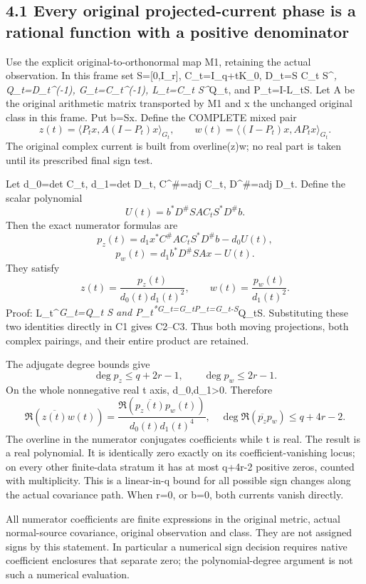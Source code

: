 \subsection{4.1 Every original projected-current phase is a rational function with a positive denominator}\label{every-original-projected-current-phase-is-a-rational-function-with-a-positive-denominator}

Use the explicit original-to-orthonormal map M1, retaining the actual observation. In this frame set S={[}0,I\_r{]}, C\_t=I\_q+tK\_0, D\_t=S C\_t S\^{}\emph{, Q\_t=D\_t\^{}(-1), G\_t=C\_t\^{}(-1), L\_t=C\_t S\^{}}Q\_t, and P\_t=I-L\_tS. Let A be the original arithmetic matrix transported by M1 and x the unchanged original class in this frame. Put b=Sx. Define the COMPLETE mixed pair \[
 z(t)=\langle P_tx,A(I-P_t)x\rangle_{G_t},\qquad
 w(t)=\langle(I-P_t)x,AP_tx\rangle_{G_t}.
 \tag{C1}
\] The original complex current is built from overline(z)w; no real part is taken until its prescribed final sign test.

Let d\_0=det C\_t, d\_1=det D\_t, C\^{}\#=adj C\_t, D\^{}\#=adj D\_t. Define the scalar polynomial \[
 U(t)=b^*D^\# S A C_tS^*D^\#b.
\] Then the exact numerator formulas are \[
 p_z(t)=d_1x^*C^\#A C_tS^*D^\#b-d_0U(t),
\] \[
 p_w(t)=d_1b^*D^\#S A x-U(t).
 \tag{C2}
\] They satisfy \[
 \boxed{z(t)=\frac{p_z(t)}{d_0(t)d_1(t)^2},\qquad
 w(t)=\frac{p_w(t)}{d_1(t)^2}.}\tag{C3}
\] Proof: L\_t\^{}\emph{G\_t=Q\_t S and P\_t\textsuperscript{*G\_t=G\_tP\_t=G\_t-S}}Q\_tS. Substituting these two identities directly in C1 gives C2--C3. Thus both moving projections, both complex pairings, and their entire product are retained.

The adjugate degree bounds give \[
 \deg p_z\le q+2r-1,\qquad \deg p_w\le2r-1.
\] On the whole nonnegative real t axis, d\_0,d\_1\textgreater0. Therefore \[
 \boxed{\Re(\overline{z(t)}w(t))
 =\frac{\Re(\overline{p_z(t)}p_w(t))}{d_0(t)d_1(t)^4},
 \quad\deg\Re(\overline{p_z}p_w)\le q+4r-2.}\tag{C4}
\] The overline in the numerator conjugates coefficients while t is real. The result is a real polynomial. It is identically zero exactly on its coefficient-vanishing locus; on every other finite-data stratum it has at most q+4r-2 positive zeros, counted with multiplicity. This is a linear-in-q bound for all possible sign changes along the actual covariance path. When r=0, or b=0, both currents vanish directly.

All numerator coefficients are finite expressions in the original metric, actual normal-source covariance, original observation and class. They are not assigned signs by this statement. In particular a numerical sign decision requires native coefficient enclosures that separate zero; the polynomial-degree argument is not such a numerical evaluation.

